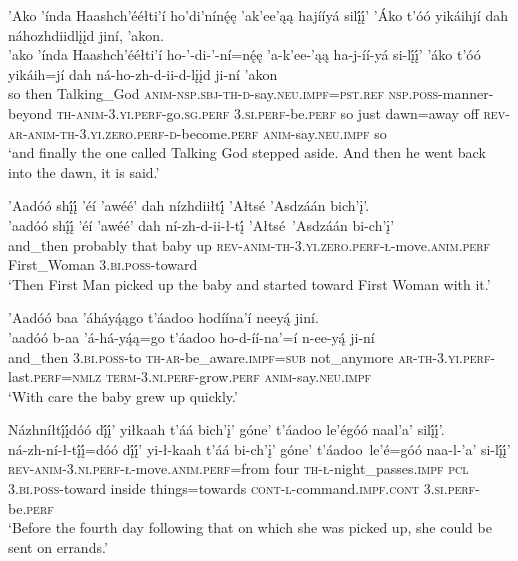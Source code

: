 \ea\label{ex:text5-6-25}
’Ako ’índa Haashch’ééłti’í ho’di’nínę́ę ’ak’ee’ąą hajííyá silį́į́’ ’Áko t’óó yikáihjí dah náhozhdiidlįįd jiní, ’akon.\\
\gll ’ako	’índa	Haashch’ééłti’í	ho-’-di-’-ní=nę́ę	’a-k’ee-’ąą	ha-j-íí-yá	si-lį́į́’	’áko	t’óó	yikáih=jí	dah	ná-ho-zh-d-ii-d-lįįd	ji-ní	’akon\\
     so	then	Talking\_God	\textsc{anim}-\textsc{nsp}.\textsc{sbj}-\textsc{th}-\textsc{d}-say.\textsc{neu}.\textsc{impf}=\textsc{pst}.\textsc{ref}	\textsc{nsp}.\textsc{poss}-manner-beyond	\textsc{th}-\textsc{anim}-3.\textsc{yi}.\textsc{perf}-go.\textsc{sg}.\textsc{perf}	3.\textsc{si}.\textsc{perf}-be.\textsc{perf}	so	just	dawn=away	off	\textsc{rev}-\textsc{ar}-\textsc{anim}-\textsc{th}-3.\textsc{yi}.\textsc{zero}.\textsc{perf}-\textsc{d}-become.\textsc{perf}	\textsc{anim}-say.\textsc{neu}.\textsc{impf}	so\\
\glt `and finally the one called Talking God stepped aside. And then he went back into the dawn, it is said.'
\z

\ea\label{ex:text5-7-1}
’Aadóó shį́į́ ’éí ’awéé’ dah nízhdiiłtį́ ’Ałtsé ’Asdzáán bich’į’.\\
\gll ’aadóó	shį́į́	’éí	’awéé’	dah	ní-zh-d-ii-ł-tį́	’Ałtsé~{’Asdzáán}	bi-ch’į’\\
     and\_then	probably	that	baby	up	\textsc{rev}-\textsc{anim}-\textsc{th}-3.\textsc{yi}.\textsc{zero}.\textsc{perf}-\textsc{ł}-move.\textsc{anim}.\textsc{perf}	First\_Woman	3.\textsc{bi}.\textsc{poss}-toward\\
\glt `Then First Man picked up the baby and started toward First Woman with it.'
\z

\ea\label{ex:text5-7-2}
’Aadóó baa ’áháyą́ągo t’áadoo hodíína’í neeyą́ jiní.\\
\gll ’aadóó	b-aa	’á-há-yą́ą=go	t’áadoo	ho-d-íí-na’=í	n-ee-yą́	ji-ní\\
     and\_then	3.\textsc{bi}.\textsc{poss}-to	\textsc{th}-\textsc{ar}-be\_aware.\textsc{impf}=\textsc{sub}	not\_anymore	\textsc{ar}-\textsc{th}-3.\textsc{yi}.\textsc{perf}-last.\textsc{perf}=\textsc{nmlz}	\textsc{term}-3.\textsc{ni}.\textsc{perf}-grow.\textsc{perf}	\textsc{anim}-say.\textsc{neu}.\textsc{impf}\\
\glt `With care the baby grew up quickly.'
\z

\ea\label{ex:text5-7-3}
Názhníłtį́į́dóó dį́į́’ yiłkaah t’áá bich’į’ góne’ t’áadoo le’égóó naal’a’ silį́į́’.\\
\gll ná-zh-ní-ł-tį́į́=dóó	dį́į́’	yi-ł-kaah	t’áá	bi-ch’į’	góne’	t’áadoo~{le’é=góó}	naa-l-’a’	si-lį́į́’\\
     \textsc{rev}-\textsc{anim}-3.\textsc{ni}.\textsc{perf}-\textsc{ł}-move.\textsc{anim}.\textsc{perf}=from	four	\textsc{th}-\textsc{ł}-night\_passes.\textsc{impf}	\textsc{pcl}	3.\textsc{bi}.\textsc{poss}-toward	inside	things=towards	\textsc{cont}-\textsc{l}-command.\textsc{impf}.\textsc{cont}	3.\textsc{si}.\textsc{perf}-be.\textsc{perf}\\
\glt `Before the fourth day following that on which she was picked up, she could be sent on errands.'
\z

